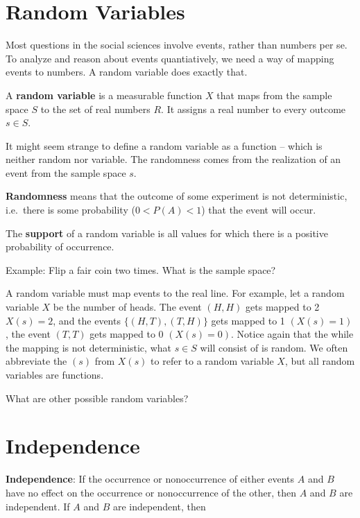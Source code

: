 \documentclass[]{book}
\theoremstyle{definition}
\theoremstyle{definition}
\theoremstyle{definition}
\theoremstyle{remark}
\begin{document}
\section{Random Variables}\label{random-variables}

Most questions in the social sciences involve events, rather than
numbers per se. To analyze and reason about events quantiatively, we
need a way of mapping events to numbers. A random variable does exactly
that.

A \textbf{random variable} is a measurable function \(X\) that maps from
the sample space \(S\) to the set of real numbers \(R.\) It assigns a
real number to every outcome \(s \in S\).

It might seem strange to define a random variable as a function -- which
is neither random nor variable. The randomness comes from the
realization of an event from the sample space \(s\).

\textbf{Randomness} means that the outcome of some experiment is not
deterministic, i.e.~there is some probability (\(0 < P(A) < 1\)) that
the event will occur.

The \textbf{support} of a random variable is all values for which there
is a positive probability of occurrence.

\begin{framed}

Example: Flip a fair coin two times.   What is the sample space? 

A random variable must map events to the real line. For example, let a random variable $X$ be the number of heads. The event $(H, H)$ gets mapped to 2 $X(s) = 2$, and the events $\{(H, T), (T, H)\}$ gets mapped to 1 $(X(s) = 1)$, the event $(T, T)$ gets mapped to 0 $(X(s) = 0)$. Notice again that the while the mapping is not deterministic, what $s \in S$ will consist of is random. We often abbreviate the $(s)$ from $X(s)$ to refer to a random variable $X$, but all random variables are functions.

What are other possible random variables?
\end{framed}

\section{Independence}\label{independence}

\textbf{Independence}: If the occurrence or nonoccurrence of either
events \(A\) and \(B\) have no effect on the occurrence or nonoccurrence
of the other, then \(A\) and \(B\) are independent. If \(A\) and \(B\)
are independent, then
\end{document}
